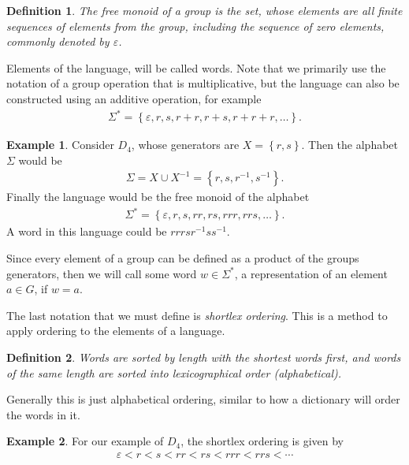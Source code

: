 \documentclass[10pt]{amsart}
\newtheorem{idefinition}{Definition}
\theoremstyle{definition}
\newtheorem*{iexample}{Example}
\theoremstyle{remark}
\newenvironment{example}{\begin{center}\begin{minipage}{0.9\textwidth}\begin{iexample}}{\end{iexample}\end{minipage}\end{center}}
\newenvironment{definition}{\begin{center}\begin{minipage}{0.9\textwidth}\begin{idefinition}}{\end{idefinition}\end{minipage}\end{center}}
\begin{document}
\begin{definition}
  The free monoid of a group is the set, whose elements are all finite
  sequences of elements from the group, including the sequence of zero
  elements, commonly denoted by $\varepsilon$.
\end{definition}

Elements of the language, will be called words. Note that we primarily use the
notation of a group operation that is multiplicative, but the language can also
be constructed using an additive operation, for example
\begin{align*}
  \Sigma^*=\left\{\varepsilon, r, s, r+r, r+s, r+r+r,\ldots\right\}.
\end{align*}

\begin{example}
  Consider $D_4$, whose generators are $X=\left\{r,s\right\}$. Then the
  alphabet $\Sigma$ would be 
  \begin{align*}
    \Sigma=X\cup X^{-1}=\left\{r,s,r^{-1},s^{-1}\right\}.
  \end{align*}
  Finally the language would be the free monoid of the alphabet
  \begin{align*}
    \Sigma^*=\left\{\varepsilon, r, s, rr,rs,rrr,rrs,\ldots\right\}.
  \end{align*}
  A word in this language could be $rrrsr^{-1}ss^{-1}$.
\end{example}

Since every element of a group can be defined as a product of the groups
generators, then we will call some word $w\in\Sigma^*$, a representation of an
element $a\in G$, if $w=a$.

The last notation that we must define is \textit{shortlex ordering}. This is a
method to apply ordering to the elements of a language.

\begin{definition}
  Words are sorted by length with the shortest words first, and words of the
  same length are sorted into lexicographical order (alphabetical).
\end{definition}

Generally this is just alphabetical ordering, similar to how a dictionary will
order the words in it.

\begin{example}
  For our example of $D_4$, the shortlex ordering is given by
  \begin{align*}
    \varepsilon < r < s < rr < rs < rrr < rrs < \cdots
  \end{align*}
\end{example}
\end{document}
